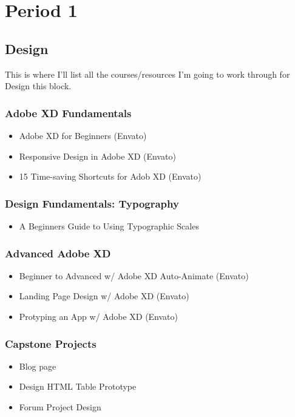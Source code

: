 \section{Period 1}

\subsection{Design}
This is where I'll list all the courses/resources I'm going to work through for Design this block.

\subsubsection{Adobe XD Fundamentals}

\begin{itemize}
  \item Adobe XD for Beginners (Envato) 
  \item Responsive Design in Adobe XD (Envato) 
  \item 15 Time-saving Shortcuts for Adob XD (Envato) 
\end{itemize}

\subsubsection{Design Fundamentals: Typography}

\begin{itemize}
  \item A Beginners Guide to Using Typographic Scales
\end{itemize}


\subsubsection{Advanced Adobe XD}

\begin{itemize}
  \item Beginner to Advanced w/ Adobe XD Auto-Animate (Envato) 
  \item Landing Page Design w/ Adobe XD (Envato) 
  \item Protyping an App w/ Adobe XD (Envato) 
\end{itemize}

\subsubsection{Capstone Projects}
\begin{itemize}
  \item Blog page
  \item Design HTML Table Prototype
  \item Forum Project Design
\end{itemize}

